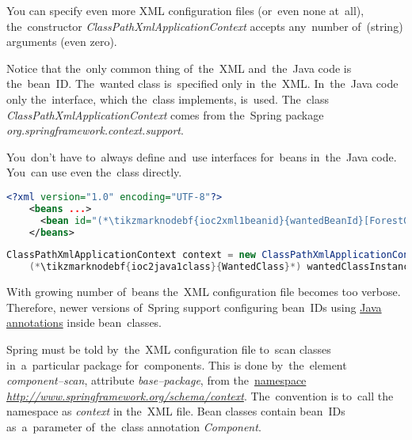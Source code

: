 \noindent You can specify even more XML configuration files (or~even none at~all), the~constructor \textit{ClassPathXmlApplicationContext} accepts any~number of~(string) arguments (even zero).

Notice that the~only common thing of~the~XML and~the~Java code is the~bean~ID. The~wanted class is~specified only in~the~XML. In~the~Java code only the~interface, which the~class implements, is~used. The~class \textit{ClassPathXmlApplicationContext} comes from the~Spring package \textit{org.springframework.context.support}.

\note You~don't have to~always define and~use interfaces for~beans in~the~Java code. You~can use even the~class directly.

\example
\begin{lstlisting}[language=XML, title={Configuration XML}]
    <?xml version="1.0" encoding="UTF-8"?>
    <beans ...>
      <bean id="(*\tikzmarknodebf{ioc2xml1beanid}{wantedBeanId}[ForestGreen]*)" class="package.subfolder.(*\tikzmarknodebf{ioc2xml1class}{WantedClass}[ForestGreen]*)"/>
    </beans>
\end{lstlisting}
\begin{lstlisting}[language=Java, title={Usage}]
    ClassPathXmlApplicationContext context = new ClassPathXmlApplicationContext("configurationFile.xml");
    (*\tikzmarknodebf{ioc2java1class}{WantedClass}*) wantedClassInstance = context.getBean("(*\tikzmarknodebf{ioc2java1beanid}{wantedBeanId}[ForestGreen]*)", (*\tikzmarknodebf{ioc2java1class2}{WantedClass}*).class);
\end{lstlisting}
\newpage

With growing number of~beans the~XML configuration file becomes too verbose. Therefore, newer versions of~Spring support configuring bean~IDs using \hyperref[javaannotation]{Java annotations} inside bean~classes.

Spring must be told by~the~XML configuration file to~scan classes in~a~particular package for~components. This is done by~the~element \textit{component--scan}, attribute \textit{base--package}, from the~\hyperref[namespaces]{namespace} \textit{\href{http://www.springframework.org/schema/context}{http://www.springframework.org/schema/context}}. The~convention is to~call the namespace as \textit{context} in the~XML file. Bean classes contain bean~IDs as~a~parameter of~the~class annotation \textit{Component}.

